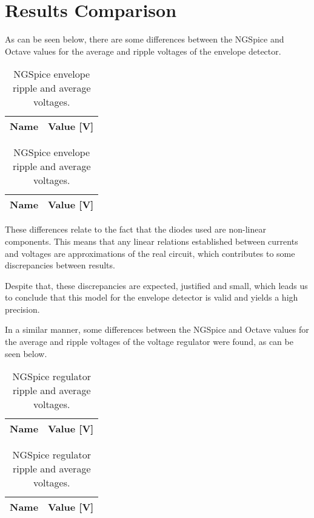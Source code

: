 \section{Results Comparison}
\label{sec:comparison}

As can be seen below, there are some differences between the NGSpice and Octave values for the average and ripple voltages of the envelope detector.


\begin{table}[h]
        \parbox{.45\linewidth}{
  \centering
  \begin{tabular}{|l|r|}
    \hline
    {\bf Name} & {\bf Value [V]} \\ \hline
    
  \end{tabular}
  \caption{Octave envelope ripple and average voltages.}
        \label{tab:envelopecomp}
}
\hfill
        \parbox{.45\linewidth}{
  \centering
  \begin{tabular}{|l|r|}
    \hline
    {\bf Name} & {\bf Value [V]} \\ \hline
    
  \end{tabular}
  \caption{NGSpice envelope ripple and average voltages.}
  \label{tab:envcomp}
}
\end{table}



These differences relate to the fact that the diodes used are non-linear components. This means that any linear relations established between currents and voltages are approximations of the real circuit, which contributes to some discrepancies between results.

Despite that, these discrepancies are expected, justified and small, which leads us to conclude that this model for the envelope detector is valid and yields a high precision.  

In a similar manner, some differences between the NGSpice and Octave values for the average and ripple voltages of the voltage regulator were found, as can be seen below.


\begin{table}[h]
        \parbox{.45\linewidth}{
  \centering
  \begin{tabular}{|l|r|}
    \hline
    {\bf Name} & {\bf Value [V]} \\ \hline
    
  \end{tabular}
  \caption{Octave regulator ripple and average voltages.}      
        \label{tab:regulatorcomp}
}
\hfill
        \parbox{.45\linewidth}{
  \centering
  \begin{tabular}{|l|r|}
    \hline
    {\bf Name} & {\bf Value [V]} \\ \hline
         
  \end{tabular}
  \caption{NGSpice regulator ripple and average voltages.}
  \label{tab:regcomp}
}
\end{table}




